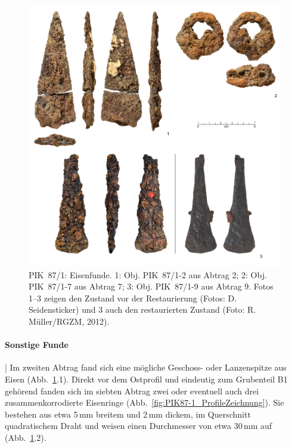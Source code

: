\begin{figure}[tb!]
	\centering
	\includegraphics[width=\textwidth]{fig/PIK87-1_Eisen_2014-01-17.jpg}
	\caption{PIK~87/1: Eisenfunde. 1: Obj. PIK~87/1-2 aus Abtrag 2; 2: Obj. PIK~87/1-7 aus Abtrag 7; 3: Obj. PIK~87/1-9 aus Abtrag 9. Fotos 1--3 zeigen den Zustand vor der Restaurierung (Fotos: D. Seidensticker) und 3 auch den restaurierten Zustand (Foto: R. Müller/RGZM, 2012).}
	\label{fig:PIK87-1_Eisen}
\end{figure}

\paragraph{Sonstige Funde}\hspace{-.5em}|\hspace{.5em}%
Im zweiten Abtrag fand sich eine mögliche Geschoss- oder Lanzenspitze aus Eisen (Abb.~\ref{fig:PIK87-1_Eisen}.1). Direkt vor dem Ostprofil und eindeutig zum Grubenteil B1 gehörend fanden sich im siebten Abtrag zwei oder eventuell auch drei zusammenkorrodierte Eisenringe (Abb.~\ref{fig:PIK87-1_ProfileZeichnung}). Sie bestehen aus etwa 5\,mm breitem und 2\,mm dickem, im Querschnitt quadratischem Draht und weisen einen Durchmesser von etwa 30\,mm auf (Abb.~\ref{fig:PIK87-1_Eisen}.2).

